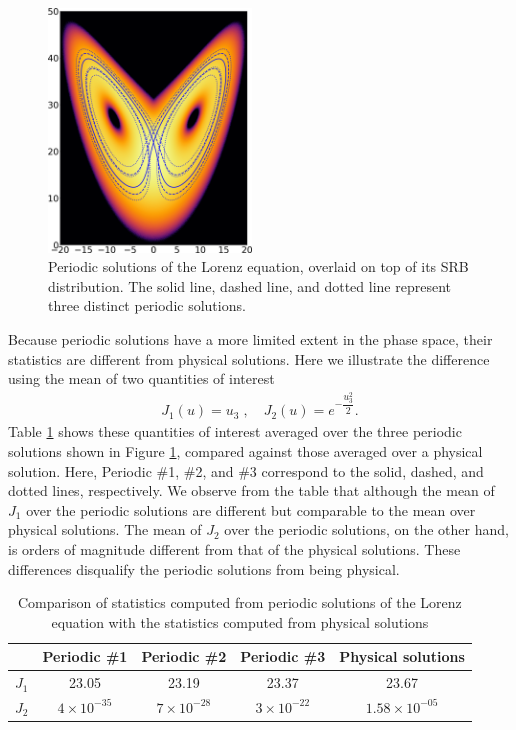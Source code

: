 \begin{figure}[H]\centering
\includegraphics[width=0.48\textwidth]{figure/lorenz_periodic.png}
\caption{Periodic solutions of the Lorenz equation, overlaid on top of
its SRB distribution.  The solid line, dashed line, and dotted line
represent three distinct periodic solutions.}
\label{fig:lorenz_periodic}
\end{figure}

Because periodic solutions have a more limited extent in the phase space, their
statistics are different from physical solutions.
Here we illustrate the difference using the mean of two
quantities of interest
\begin{align}
    J_1(u) = u_3\;,\quad J_2(u) = e^{-\dfrac{u_3^2}2}.
\end{align}
Table \ref{tab:lorenz_periodic_stats} shows these quantities
of interest averaged over the three periodic solutions shown in Figure
\ref{fig:lorenz_periodic}, compared against those averaged over a
physical solution.  Here, Periodic \#1, \#2, and \#3 correspond to
the solid, dashed, and dotted lines, respectively.
We observe from the table that although the mean of $J_1$ over the periodic
solutions are different but comparable to the mean over physical solutions.  The mean of $J_2$ over the periodic solutions, on the other hand,
is orders of magnitude different from that of the physical solutions.
These differences disqualify the periodic solutions from being physical.
\begin{table}[H]
    \centering
    \begin{tabular}{c|c|c|c|c}
             & Periodic \#1 & Periodic \#2
             & Periodic \#3 & Physical solutions \\
    \hline
        $J_1$& 23.05 &
               23.19 &
               23.37 &
               23.67 \\
        $J_2$&$4\times 10^{-35}$&
              $7\times 10^{-28}$&
              $3\times 10^{-22}$&
              $1.58\times 10^{-05}$
    \end{tabular}
    \caption{Comparison of statistics computed from periodic solutions of the Lorenz equation with the statistics computed from physical solutions}
    \label{tab:lorenz_periodic_stats}
\end{table}

